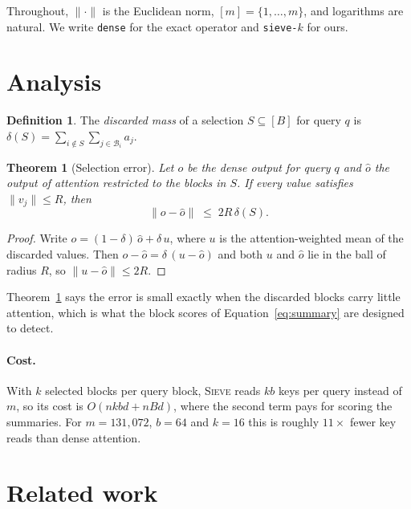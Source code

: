 \documentclass[11pt]{article}
\newcommand{\norm}[1]{\lVert #1 \rVert}
\newtheorem{theorem}{Theorem}
\theoremstyle{definition}
\newtheorem{definition}{Definition}
\begin{document}
Throughout, $\norm{\cdot}$ is the Euclidean norm, $[m] = \{1, \dots, m\}$, and
logarithms are natural. We write \texttt{dense} for the exact operator and
\texttt{sieve-}$k$ for ours.



\section{Analysis}
\label{sec:analysis}

\begin{definition}
The \emph{discarded mass} of a selection $S \subseteq [B]$ for query $q$ is
$\delta(S) = \sum_{i \notin S} \sum_{j \in \mathcal{B}_i} a_j$.
\end{definition}

\begin{theorem}[Selection error]
\label{thm:error}
Let $o$ be the dense output for query $q$ and $\hat{o}$ the output of attention
restricted to the blocks in $S$. If every value satisfies $\norm{v_j} \le R$, then
\[
  \norm{o - \hat{o}} \;\le\; 2R\,\delta(S).
\]
\end{theorem}

\begin{proof}
Write $o = (1-\delta)\,\hat{o} + \delta\, u$, where $u$ is the attention-weighted
mean of the discarded values. Then $o - \hat{o} = \delta\,(u - \hat{o})$ and both
$u$ and $\hat{o}$ lie in the ball of radius $R$, so
$\norm{u - \hat{o}} \le 2R$.
\end{proof}

Theorem~\ref{thm:error} says the error is small exactly when the discarded
blocks carry little attention, which is what the block scores of
Equation~\eqref{eq:summary} are designed to detect.

\paragraph{Cost.} With $k$ selected blocks per query block, \textsc{Sieve}
reads $kb$ keys per query instead of $m$, so its cost is $O(nkbd + nBd)$, where
the second term pays for scoring the summaries. For $m = 131{,}072$, $b = 64$
and $k = 16$ this is roughly $11\times$ fewer key reads than dense attention.



\section{Related work}
\label{sec:related}
\end{document}
